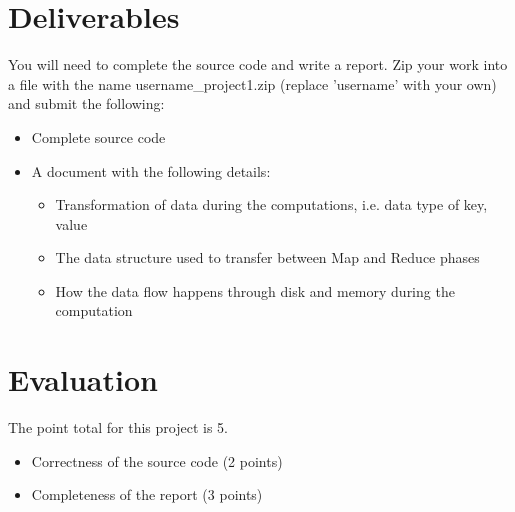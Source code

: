 \documentclass{article}
\begin{document}
\section*{Deliverables}
You will need to complete the source code and write a report. Zip your work into a file with the name username\_project1.zip (replace 'username' with your own) and submit the following:
\begin{itemize}
\item Complete source code
\item A document with the following details:
\begin{itemize}
\item	Transformation of data during the computations, i.e. data type of key, value
\item	The data structure used to transfer between Map and Reduce phases
\item	How the data flow happens through disk and memory during the computation
\end{itemize}
\end{itemize}

\section*{Evaluation}
The point total for this project is 5.
\begin{itemize}
\item Correctness of the source code (2 points)
\item	Completeness of the report (3 points)
\end{itemize}

 
\end{document}
